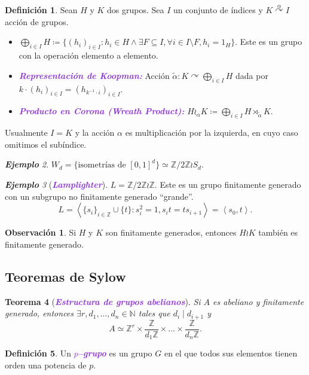\documentclass{article}
\newtheorem{theorem}{Teorema}[subsection]
\theoremstyle{definition}
\newtheorem{definition}[theorem]{Definición}
\newtheorem*{obs}{Observación}
\theoremstyle{remark}
\newtheorem{example}[theorem]{\textbf{Ejemplo}}
\numberwithin{equation}{section}
\newcommand{\N}{\mathbb{N}}
\newcommand{\Z}{\mathbb{Z}}
\renewcommand{\a}{\alpha}
\newcommand{\acts}{\curvearrowright}
\newcommand{\actsby}[1]{\stackrel{#1}{\acts}}
\renewcommand{\c}{\cdot}
\renewcommand{\tilde}{\widetilde}
\newcommand{\gen}[1]{\left\langle #1 \right\rangle}
\newcommand{\znz}[1]{\frac{\Z}{#1 \Z}}
\newcommand{\zmz}[1]{\Z/ #1 \Z}
\newcommand{\ds}{\displaystyle}
\newcommand{\wea}[1]{\textcolor{BlueViolet}{\textbf{\emph{#1}}}}
\begin{document}
\begin{definition}
  Sean $H$ y $K$ dos grupos. Sea $I$ un conjunto de índices y $K \actsby\a I$ acción de grupos.
  \begin{itemize}
    \item $\ds \bigoplus_{i \in I} H \coloneqq \{(h_i)_{i \in I} \colon h_i \in H \land \exists F \subseteq I, \forall i \in I \setminus F, h_i = 1_H\}.$ Este es un grupo con la operación elemento a elemento.
    \item \wea{Representación de Koopman:} Acción $\ds \tilde\a \colon K \acts \bigoplus_{i \in I} H$ dada por $k \c (h_i)_{i \in I} = (h_{k^{-1} \c i})_{i \in I}$.
    \item \wea{Producto en Corona (Wreath Product):} $\ds H \wr_\a K \coloneqq \bigoplus_{i \in I} H \rtimes_{\tilde\a} K$.
  \end{itemize}
\end{definition}

Usualmente $I = K$ y la acción $\a$ es multiplicación por la izquierda, en cuyo caso omitimos el subíndice.

\begin{example}
  $W_d = \{\text{isometrías de $[0,1]^d$}\} \simeq \zmz2 \wr S_d$.
\end{example}

\begin{example}
  [\wea{Lamplighter}]
  $L = \zmz 2 \wr \Z$. Este es un grupo finitamente generado con un subgrupo no finitamente generado ``grande''.
  \[L = \gen{\{s_i\}_{i \in \Z} \cup \{t\} \colon s_i^2 = 1, s_i t = ts_{i+1}} = \gen{s_0, t}.\]
\end{example}

\begin{obs}
  Si $H$ y $K$ son finitamente generados, entonces $H \wr K$ también es finitamente generado.
\end{obs}

\newpage
\subsection{Teoremas de Sylow}

\begin{theorem}
  [\wea{Estructura de grupos abelianos}]
  Si $A$ es abeliano y finitamente generado, entonces $\exists r,d_1,\dots, d_n \in \N$ tales que $d_i \mid d_{i+1}$ y
  \[A \simeq \Z^r \times \znz{d_1} \times \dots \times \znz{d_n}.\]
\end{theorem}

\begin{definition}
  Un \wea{$p$--grupo} es un grupo $G$ en el que todos sus elementos tienen orden una potencia de $p$.
\end{definition}
\end{document}
